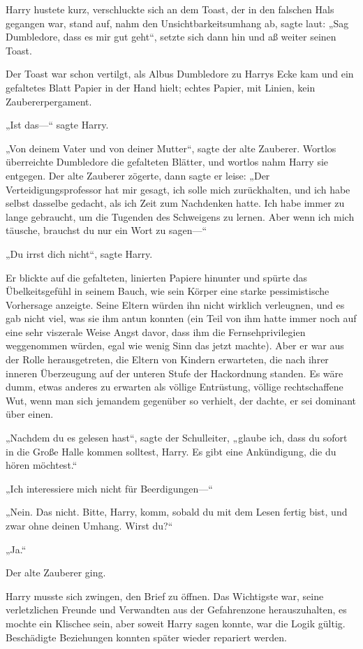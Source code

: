 {Harry hustete kurz, verschluckte sich an dem Toast, der in den falschen Hals gegangen war, stand auf, nahm den Unsichtbarkeitsumhang ab, sagte laut: „Sag Dumbledore, dass es mir gut geht“, setzte sich dann hin und aß weiter seinen Toast.

Der Toast war schon vertilgt, als Albus Dumbledore zu Harrys Ecke kam und ein gefaltetes Blatt Papier in der Hand hielt; echtes Papier, mit Linien, kein Zaubererpergament.

„Ist das—“ sagte Harry.

„Von deinem Vater und von deiner Mutter“, sagte der alte Zauberer. Wortlos überreichte Dumbledore die gefalteten Blätter, und wortlos nahm Harry sie entgegen. Der alte Zauberer zögerte, dann sagte er leise: „Der Verteidigungsprofessor hat mir gesagt, ich solle mich zurückhalten, und ich habe selbst dasselbe gedacht, als ich Zeit zum Nachdenken hatte. Ich habe immer zu lange gebraucht, um die Tugenden des Schweigens zu lernen. Aber wenn ich mich täusche, brauchst du nur ein Wort zu sagen—“

„Du irrst dich nicht“, sagte Harry.

Er blickte auf die gefalteten, linierten Papiere hinunter und spürte das Übelkeitsgefühl in seinem Bauch, wie sein Körper eine starke pessimistische Vorhersage anzeigte. Seine Eltern würden ihn nicht wirklich verleugnen, und es gab nicht viel, was sie ihm antun konnten (ein Teil von ihm hatte immer noch auf eine sehr viszerale Weise Angst davor, dass ihm die Fernsehprivilegien weggenommen würden, egal wie wenig Sinn das jetzt machte). Aber er war aus der Rolle herausgetreten, die Eltern von Kindern erwarteten, die nach ihrer inneren Überzeugung auf der unteren Stufe der Hackordnung standen. Es wäre dumm, etwas anderes zu erwarten als völlige Entrüstung, völlige rechtschaffene Wut, wenn man sich jemandem gegenüber so verhielt, der dachte, er sei dominant über einen.

„Nachdem du es gelesen hast“, sagte der Schulleiter, „glaube ich, dass du sofort in die Große Halle kommen solltest, Harry. Es gibt eine Ankündigung, die du hören möchtest.“

„Ich interessiere mich nicht für Beerdigungen—“

„Nein. Das nicht. Bitte, Harry, komm, sobald du mit dem Lesen fertig bist, und zwar ohne deinen Umhang. Wirst du?“

„Ja.“

Der alte Zauberer ging.

Harry musste sich zwingen, den Brief zu öffnen. Das Wichtigste war, seine verletzlichen Freunde und Verwandten aus der Gefahrenzone herauszuhalten, es mochte ein Klischee sein, aber soweit Harry sagen konnte, war die Logik gültig. Beschädigte Beziehungen konnten später wieder repariert werden.

}

